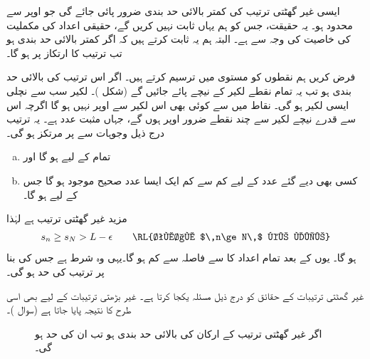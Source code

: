 ایسی غیر گھٹتی  ترتیب کی کمتر بالائی حد بندی ضرور پائی جائے گی جو اوپر سے محدود ہو۔ یہ حقیقت، جس کو ہم یہاں ثابت نہیں کریں گے، حقیقی اعداد کی مکملیت کی خاصیت کی وجہ سے ہے۔ البتہ ہم یہ ثابت کرتے ہیں کہ اگر  کمتر بالائی حد بندی ہو تب  ترتیب  کا ارتکاز  پر  ہو گا۔

فرض کریں ہم   نقطوں کو مستوی   میں ترسیم کرتے ہیں۔ اگر اس ترتیب کی بالائی حد بندی   ہو تب یہ تمام نقطے لکیر  کے نیچے پائے جائیں گے (شکل )۔ لکیر  سب سے نچلی ایسی لکیر ہو گی۔ نقاط  میں سے کوئی بھی اس لکیر سے اوپر نہیں ہو گا اگرچہ اس سے قدرے  نیچے لکیر  سے چند نقطے  ضرور اوپر  ہوں گے، جہاں  مثبت عدد ہے۔ یہ ترتیب درج ذیل وجوہات  سے  پر مرتکز ہو گی۔
\begin{enumerate}[a.]
\item
تمام  کے لیے  ہو گا اور
\item
کسی بھی دیے گئے عدد  کے لیے کم سے کم ایک ایسا عدد صحیح   موجود ہو گا جس کے لیے  ہو گا۔
\end{enumerate}
مزید  غیر گھٹتی  ترتیب  ہے لہٰذا
\begin{align*} 
s_n\ge s_N>L-\epsilon\quad\quad  \text{\RL{تمام $\,n\ge N\,$ کے لیے}}
\end{align*}
ہو گا۔ یوں  کے بعد تمام اعداد  کا  سے فاصلہ  سے کم ہو گا۔یہی وہ شرط ہے جس کی بنا پر ترتیب  کی حد  ہو گی۔

غیر گھٹتی  ترتیبات کے حقائق کو درج ذیل مسئلہ  یکجا  کرتا ہے۔ غیر بڑھتی ترتیبات کے لیے بھی اسی طرح کا نتیجہ   پایا جاتا ہے (سوال )۔
\begin{figure}
\centering
{}
\caption
{اگر غیر گھٹتی ترتیب کے ارکان  کی بالائی حد بندی  ہو تب ان کی حد   ہو گی۔}
\label{شکل_تسلسل_بالائی_حد_بندی_اور_حد}
\end{figure}

